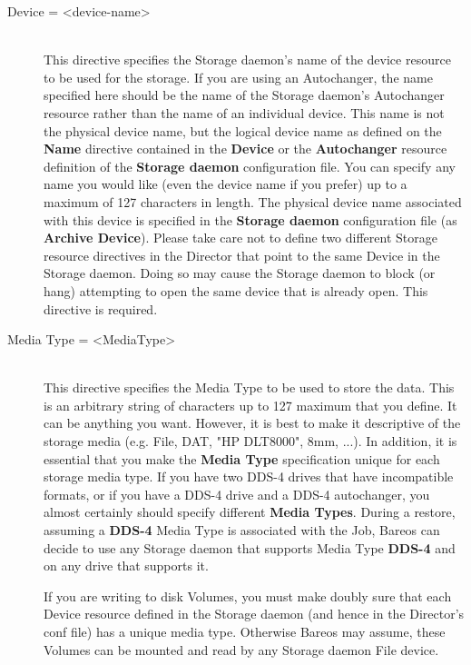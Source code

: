 \begin{description}
\item [Device = {\textless}device-name{\textgreater}] \hfill \\
This directive specifies the Storage daemon's name of the device
resource to be used for the storage.  If you are using an Autochanger,
the name specified here should be the name of the Storage daemon's
Autochanger resource rather than the name of an individual device.  This
name is not the physical device name, but the logical device name as
defined on the {\bf Name} directive contained in the {\bf Device} or the
{\bf Autochanger} resource definition of the {\bf Storage daemon}
configuration file.  You can specify any name you would like (even the
device name if you prefer) up to a maximum of 127 characters in length.
The physical device name associated with this device is specified in the
{\bf Storage daemon} configuration file (as {\bf Archive Device}).
Please take care not to define two different Storage resource directives
in the Director that point to the same Device in the Storage daemon.
Doing so may cause the Storage daemon to block (or hang) attempting to
open the same device that is already open.  This directive is required.

\label{MediaType}
\item [Media Type = {\textless}MediaType{\textgreater}] \hfill \\
This directive specifies the Media Type to be used to store the data.
This is an arbitrary string of characters up to 127 maximum that you
define.  It can be anything you want.  However, it is best to make it
descriptive of the storage media (e.g.  File, DAT, "HP DLT8000", 8mm,
...).  In addition, it is essential that you make the {\bf Media Type}
specification unique for each storage media type.  If you have two DDS-4
drives that have incompatible formats, or if you have a DDS-4 drive and
a DDS-4 autochanger, you almost certainly should specify different {\bf
Media Types}.  During a restore, assuming a {\bf DDS-4} Media Type is
associated with the Job, Bareos can decide to use any Storage daemon
that supports Media Type {\bf DDS-4} and on any drive that supports it.

If you are writing to disk Volumes, you must make doubly sure that each
Device resource defined in the Storage daemon (and hence in the
Director's conf file) has a unique media type.  Otherwise Bareos
may assume, these Volumes can be mounted and read by any Storage daemon File device.


\end{description}
